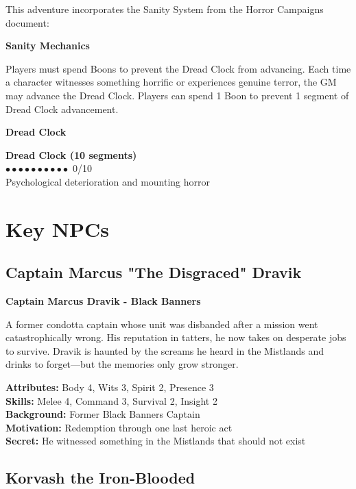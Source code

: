 \documentclass[12pt,twoside]{article}
\newenvironment{adventurebox}[1]{
  \begin{mdframed}[
    linewidth=2pt,
    linecolor=serpentgreen,
    backgroundcolor=gray!10,
    innertopmargin=10pt,
    innerbottommargin=10pt,
    innerrightmargin=10pt,
    innerleftmargin=10pt
  ]
  \textbf{#1}
}{\end{mdframed}}
\newenvironment{npcbox}[1]{
  \begin{mdframed}[
    linewidth=1pt,
    linecolor=dungeongray,
    backgroundcolor=white,
    innertopmargin=5pt,
    innerbottommargin=5pt,
    innerrightmargin=5pt,
    innerleftmargin=5pt
  ]
  \textbf{#1}
}{\end{mdframed}}
\begin{document}
This adventure incorporates the Sanity System from the Horror Campaigns document:

\begin{adventurebox}{Sanity Mechanics}
Players must spend Boons to prevent the Dread Clock from advancing. Each time a character witnesses something horrific or experiences genuine terror, the GM may advance the Dread Clock. Players can spend 1 Boon to prevent 1 segment of Dread Clock advancement.
\end{adventurebox}

\begin{adventurebox}{Dread Clock}
\textbf{Dread Clock (10 segments)} \\
$\bullet\bullet\bullet\bullet\bullet\bullet\bullet\bullet\bullet\bullet$ 0/10 \\
Psychological deterioration and mounting horror
\end{adventurebox}

\section{Key NPCs}

\subsection{Captain Marcus "The Disgraced" Dravik}

\begin{npcbox}{Captain Marcus Dravik - Black Banners}
A former condotta captain whose unit was disbanded after a mission went catastrophically wrong. His reputation in tatters, he now takes on desperate jobs to survive. Dravik is haunted by the screams he heard in the Mistlands and drinks to forget—but the memories only grow stronger.

\textbf{Attributes:} Body 4, Wits 3, Spirit 2, Presence 3 \\
\textbf{Skills:} Melee 4, Command 3, Survival 2, Insight 2 \\
\textbf{Background:} Former Black Banners Captain \\
\textbf{Motivation:} Redemption through one last heroic act \\
\textbf{Secret:} He witnessed something in the Mistlands that should not exist
\end{npcbox}

\subsection{Korvash the Iron-Blooded}
\end{document}
